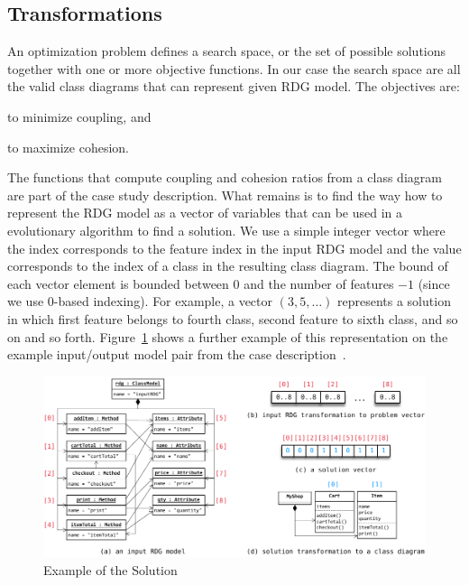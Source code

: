 \subsection{Transformations}

An optimization problem defines a search space, or the set of possible solutions together with one or more objective functions.
In our case the search space are all the valid class diagrams that can represent given RDG model.
The objectives are:
%
\begin{inparaenum}[(1)]
\item to minimize coupling, and
\item to maximize cohesion.     
\end{inparaenum}

The functions that compute coupling and cohesion ratios from a class diagram are part of the case study description.
What remains is to find the way how to represent the RDG model as a vector of variables that can be used in a evolutionary algorithm to find a solution.
We use a simple integer vector where the index corresponds to the feature index in the input RDG model and the value corresponds to the index of a class in the resulting class diagram.
The bound of each vector element is bounded between 0 and the number of features $- 1$ (since we use 0-based indexing).
For example, a vector $\left( 3, 5, \dots \right)$ represents a solution in which first feature belongs to fourth class, second feature to sixth class, and so on and so forth.
Figure~\ref{fig:SolutionOverview} shows a further example of this representation on the example input/output model pair from the case description~\cite{Fleck2016}.

\begin{figure}[h!tb]
  \centering
  \includegraphics[width=.9\columnwidth]{figures/solution-overview.pdf}
  \caption{Example of the Solution}
  \label{fig:SolutionOverview}
\end{figure}

